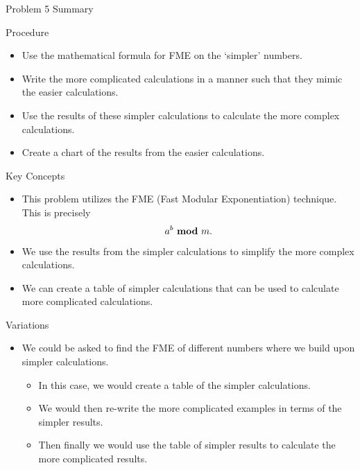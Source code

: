 \begin{summary}{Problem 5 Summary}
    \begin{statement}{Procedure}
        \begin{itemize}
            \item Use the mathematical formula for FME on the `simpler' numbers.
            \item Write the more complicated calculations in a manner such that they mimic the easier calculations.
            \item Use the results of these simpler calculations to calculate the more complex calculations.
            \item Create a chart of the results from the easier calculations.
        \end{itemize}
    \end{statement}
    \begin{statement}{Key Concepts}
        \begin{itemize}
            \item This problem utilizes the FME (Fast Modular Exponentiation) technique. This is precisely
            \begin{equation*}
                a^{b} \text{ \textbf{mod} } m.
            \end{equation*}
            \item We use the results from the simpler calculations to simplify the more complex calculations.
            \item We can create a table of simpler calculations that can be used to calculate more complicated calculations.
        \end{itemize}
    \end{statement}
    \begin{statement}{Variations}
        \begin{itemize}
            \item We could be asked to find the FME of different numbers where we build upon simpler calculations.
            \begin{itemize}
                \item In this case, we would create a table of the simpler calculations.
                \item We would then re-write the more complicated examples in terms of the simpler results.
                \item Then finally we would use the table of simpler results to calculate the more complicated results.
            \end{itemize}
        \end{itemize}
    \end{statement}
\end{summary}

